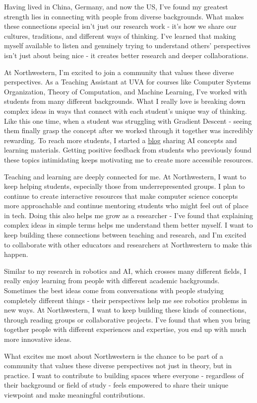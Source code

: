 \documentclass[11pt]{article}
\begin{document}
Having lived in China, Germany, and now the US, I've found my greatest strength lies in connecting with people from diverse backgrounds. What makes these connections special isn't just our research work - it's how we share our cultures, traditions, and different ways of thinking. I've learned that making myself available to listen and genuinely trying to understand others' perspectives isn't just about being nice - it creates better research and deeper collaborations.

At Northwestern, I'm excited to join a community that values these diverse perspectives. As a Teaching Assistant at UVA for courses like Computer Systems Organization, Theory of Computation, and Machine Learning, I've worked with students from many different backgrounds. What I really love is breaking down complex ideas in ways that connect with each student's unique way of thinking. Like this one time, when a student was struggling with Gradient Descent - seeing them finally grasp the concept after we worked through it together was incredibly rewarding. To reach more students, I started a \href{https://www.brandonyifanyang.com/blog}{blog} sharing AI concepts and learning materials. Getting positive feedback from students who previously found these topics intimidating keeps motivating me to create more accessible resources.

Teaching and learning are deeply connected for me. At Northwestern, I want to keep helping students, especially those from underrepresented groups. I plan to continue to create interactive resources that make computer science concepts more approachable and continue mentoring students who might feel out of place in tech. Doing this also helps me grow as a researcher - I've found that explaining complex ideas in simple terms helps me understand them better myself. I want to keep building these connections between teaching and research, and I'm excited to collaborate with other educators and researchers at Northwestern to make this happen.

Similar to my research in robotics and AI, which crosses many different fields, I really enjoy learning from people with different academic backgrounds. Sometimes the best ideas come from conversations with people studying completely different things - their perspectives help me see robotics problems in new ways. At Northwestern, I want to keep building these kinds of connections, through reading groups or collaborative projects. I've found that when you bring together people with different experiences and expertise, you end up with much more innovative ideas.

What excites me most about Northwestern is the chance to be part of a community that values these diverse perspectives not just in theory, but in practice. I want to contribute to building spaces where everyone - regardless of their background or field of study - feels empowered to share their unique viewpoint and make meaningful contributions.
\end{document}
